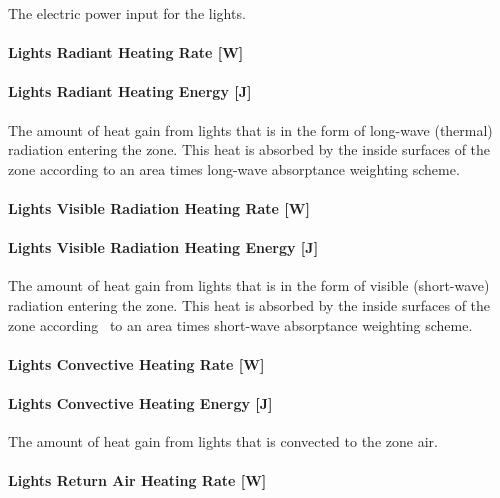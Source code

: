 The electric power input for the lights.

\paragraph{Lights Radiant Heating Rate {[}W{]}}\label{lights-radiant-heating-rate-w}

\paragraph{Lights Radiant Heating Energy {[}J{]}}\label{lights-radiant-heating-energy-j}

The amount of heat gain from lights that is in the form of long-wave (thermal) radiation entering the zone. This heat is absorbed by the inside surfaces of the zone according to an area times long-wave absorptance weighting scheme.

\paragraph{Lights Visible Radiation Heating Rate {[}W{]}}\label{lights-visible-radiation-heating-rate-w}

\paragraph{Lights Visible Radiation Heating Energy {[}J{]}}\label{lights-visible-radiation-heating-energy-j}

The amount of heat gain from lights that is in the form of visible (short-wave) radiation entering the zone. This heat is absorbed by the inside surfaces of the zone according~ to an area times short-wave absorptance weighting scheme.

\paragraph{Lights Convective Heating Rate {[}W{]}}\label{lights-convective-heating-rate-w}

\paragraph{Lights Convective Heating Energy {[}J{]}}\label{lights-convective-heating-energy-j}

The amount of heat gain from lights that is convected to the zone air.

\paragraph{Lights Return Air Heating Rate {[}W{]}}\label{lights-return-air-heating-rate-w}

